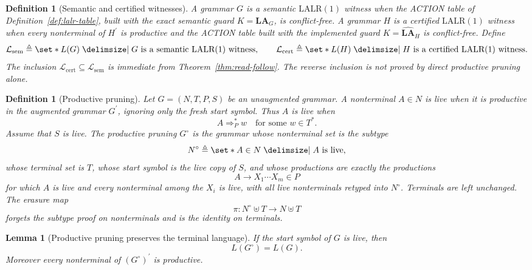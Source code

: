 \documentclass[11pt,a4paper]{article}
\theoremstyle{prettyplain}
\newtheorem{lemma}[theorem]{Lemma}
\theoremstyle{prettydef}
\newtheorem{definition}[theorem]{Definition}
\def\mid{\;\delimsize\vert\;}#1%
\newcommand{\LALRone}{\mathrm{LALR(1)}}
\newcommand{\Look}{\mathbf{LA}}
\begin{document}
\begin{definition}[Semantic and certified witnesses]
\label{def:semantic-certified-witness}
A grammar \(G\) is a \emph{semantic \(\LALRone\) witness} when the ACTION table
of Definition~\ref{def:lalr-table}, built with the exact semantic guard
\(K=\Look_G\), is conflict-free.  A grammar \(H\) is a
\emph{certified \(\LALRone\) witness} when every nonterminal of \(H^\prime\) is
productive and the ACTION table built with the implemented guard
\(K=\widehat{\Look}_H\) is conflict-free.
Define
\[
\mathcal L_{\mathrm{sem}}
\triangleq
\set*{L(G)\mid G\text{ is a semantic }\LALRone\text{ witness}},
\qquad
\mathcal L_{\mathrm{cert}}
\triangleq
\set*{L(H)\mid H\text{ is a certified }\LALRone\text{ witness}}.
\]
The inclusion \(\mathcal L_{\mathrm{cert}}\subseteq\mathcal L_{\mathrm{sem}}\)
is immediate from Theorem~\ref{thm:read-follow}.  The reverse inclusion is not
proved by direct productive pruning alone.
\end{definition}

\begin{definition}[Productive pruning]
\label{def:productive-pruning}
Let \(G=(N,T,P,S)\) be an unaugmented grammar.  A nonterminal \(A\in N\) is
\emph{live} when it is productive in the augmented grammar \(G^\prime\), ignoring
only the fresh start symbol.  Thus \(A\) is live when
\[
A\Rightarrow_{P}^{*} w
\quad\text{for some }w\in T^* .
\]
Assume that \(S\) is live.  The \emph{productive pruning} \(G^\circ\) is the
grammar whose nonterminal set is the subtype
\[
N^\circ \triangleq \set*{A\in N\mid A\text{ is live}},
\]
whose terminal set is \(T\), whose start symbol is the live copy of \(S\), and
whose productions are exactly the productions
\[
A\to X_1\cdots X_m\in P
\]
for which \(A\) is live and every nonterminal among the \(X_i\) is live, with
all live nonterminals retyped into \(N^\circ\).  Terminals are left unchanged.
The erasure map
\[
\pi:N^\circ\uplus T\to N\uplus T
\]
forgets the subtype proof on nonterminals and is the identity on terminals.
\end{definition}

\begin{lemma}[Productive pruning preserves the terminal language]
\label{lem:productive-pruning-language}
If the start symbol of \(G\) is live, then
\[
L(G^\circ)=L(G).
\]
Moreover every nonterminal of \((G^\circ)^\prime\) is productive.
\end{lemma}
\end{document}
